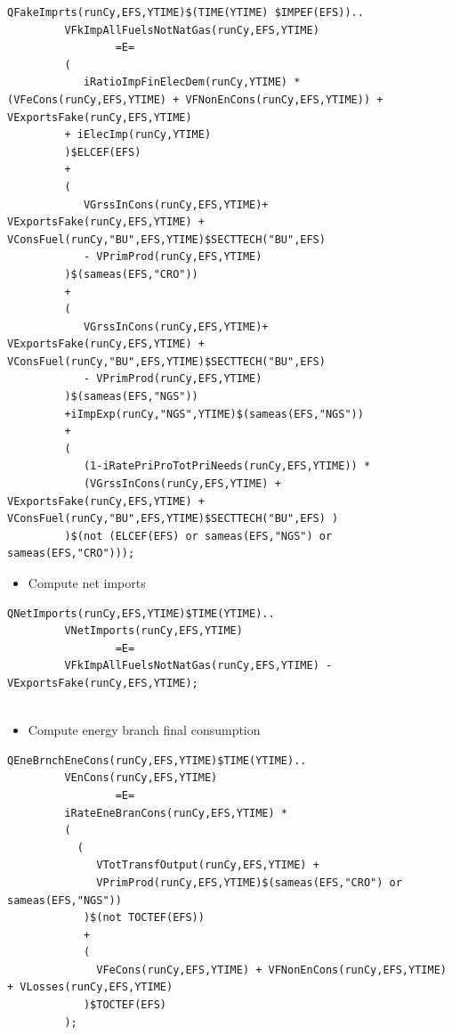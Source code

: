 \documentclass[a4paper,]{scrartcl}
\providecommand{\tightlist}{%
  \setlength{\itemsep}{0pt}\setlength{\parskip}{0pt}}
\begin{document}
\begin{lstlisting}
QFakeImprts(runCy,EFS,YTIME)$(TIME(YTIME) $IMPEF(EFS))..
         VFkImpAllFuelsNotNatGas(runCy,EFS,YTIME)
                 =E=
         (
            iRatioImpFinElecDem(runCy,YTIME) * (VFeCons(runCy,EFS,YTIME) + VFNonEnCons(runCy,EFS,YTIME)) + VExportsFake(runCy,EFS,YTIME)
         + iElecImp(runCy,YTIME)
         )$ELCEF(EFS)
         +
         (
            VGrssInCons(runCy,EFS,YTIME)+ VExportsFake(runCy,EFS,YTIME) + VConsFuel(runCy,"BU",EFS,YTIME)$SECTTECH("BU",EFS)
            - VPrimProd(runCy,EFS,YTIME)
         )$(sameas(EFS,"CRO"))
         +
         (
            VGrssInCons(runCy,EFS,YTIME)+ VExportsFake(runCy,EFS,YTIME) + VConsFuel(runCy,"BU",EFS,YTIME)$SECTTECH("BU",EFS)
            - VPrimProd(runCy,EFS,YTIME)
         )$(sameas(EFS,"NGS"))
         +iImpExp(runCy,"NGS",YTIME)$(sameas(EFS,"NGS"))
         +
         (
            (1-iRatePriProTotPriNeeds(runCy,EFS,YTIME)) *
            (VGrssInCons(runCy,EFS,YTIME) + VExportsFake(runCy,EFS,YTIME) + VConsFuel(runCy,"BU",EFS,YTIME)$SECTTECH("BU",EFS) )
         )$(not (ELCEF(EFS) or sameas(EFS,"NGS") or sameas(EFS,"CRO")));
\end{lstlisting}

\begin{itemize}
\tightlist
\item
  Compute net imports
\end{itemize}

\begin{lstlisting}
QNetImports(runCy,EFS,YTIME)$TIME(YTIME)..
         VNetImports(runCy,EFS,YTIME)
                 =E=
         VFkImpAllFuelsNotNatGas(runCy,EFS,YTIME) - VExportsFake(runCy,EFS,YTIME);
                               
\end{lstlisting}

\begin{itemize}
\tightlist
\item
  Compute energy branch final consumption
\end{itemize}

\begin{lstlisting}
QEneBrnchEneCons(runCy,EFS,YTIME)$TIME(YTIME)..
         VEnCons(runCy,EFS,YTIME)
                 =E=
         iRateEneBranCons(runCy,EFS,YTIME) *
         (
           (
              VTotTransfOutput(runCy,EFS,YTIME) +
              VPrimProd(runCy,EFS,YTIME)$(sameas(EFS,"CRO") or sameas(EFS,"NGS"))
            )$(not TOCTEF(EFS))
            +
            (
              VFeCons(runCy,EFS,YTIME) + VFNonEnCons(runCy,EFS,YTIME) + VLosses(runCy,EFS,YTIME)
            )$TOCTEF(EFS)
         );                              
\end{lstlisting}
\end{document}

